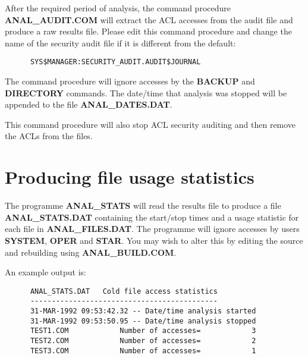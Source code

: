 After the required period of analysis, the command procedure {\bf
ANAL\_AUDIT.COM} will extract the ACL accesses from the audit file and produce
a raw results file. Please edit this command procedure  and change the name of
the security audit file if it is different from the default:

\begin{verbatim}
      SYS$MANAGER:SECURITY_AUDIT.AUDIT$JOURNAL
\end{verbatim}

The command procedure will ignore accesses by the {\bf BACKUP} and {\bf
DIRECTORY} commands. The date/time that analysis was stopped will be appended
to the file {\bf ANAL\_DATES.DAT}.

This command procedure will also stop ACL security auditing and then remove the
ACLs from the files.

\section{Producing file usage statistics}

The programme {\bf ANAL\_STATS} will read the results file to produce a file
{\bf ANAL\_STATS\-.DAT} containing the start/stop times and a usage statistic
for each file in {\bf ANAL\_FILES\-.DAT}. The programme will ignore accesses by
users {\bf SYSTEM}, {\bf OPER} and {\bf STAR}. You may wish to alter this by
editing the source and rebuilding using {\bf ANAL\_BUILD.COM}.

An example output is:
\begin{verbatim}
      ANAL_STATS.DAT   Cold file access statistics
      --------------------------------------------
      31-MAR-1992 09:53:42.32 -- Date/time analysis started
      31-MAR-1992 09:53:50.95 -- Date/time analysis stopped
      TEST1.COM            Number of accesses=            3
      TEST2.COM            Number of accesses=            2
      TEST3.COM            Number of accesses=            1
\end{verbatim}



